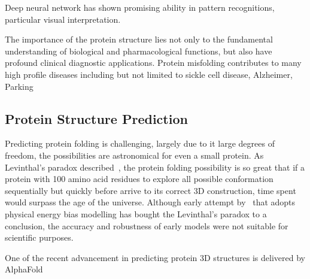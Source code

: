 Deep neural network has shown promising ability in pattern recognitions, particular visual interpretation.
\par 
The importance of the protein structure lies not only to the fundamental understanding of biological and pharmacological functions, but also have profound clinical diagnostic applications. Protein misfolding contributes to many high profile diseases including but not limited to sickle cell disease, Alzheimer, Parking 

\subsection{Protein Structure Prediction}
Predicting protein folding is challenging, largely due to it large degrees of freedom, the possibilities are astronomical for even a small protein. As Levinthal's paradox described~\cite{LEV69}, the protein folding possibility is so great that if a protein with 100 amino acid residues to explore all possible conformation sequentially but quickly before arrive to its correct 3D construction, time spent would surpass the age of the universe. Although early attempt by~\citet{Zwanzig_1992} that adopts physical energy bias modelling has bought the Levinthal's paradox to a conclusion, the accuracy and robustness of early models were not suitable for scientific purposes.  
\par 
One of the recent advancement in predicting protein 3D structures is delivered by AlphaFold